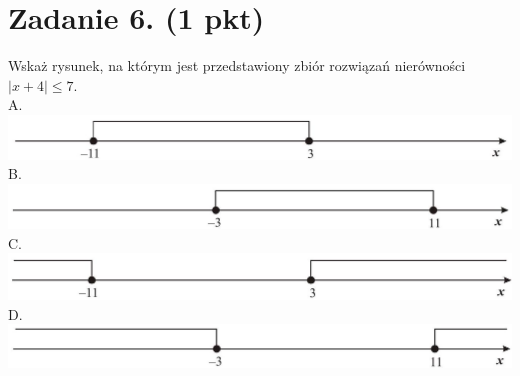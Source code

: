 \documentclass[10pt]{article}
\begin{document}
\section*{Zadanie 6. (1 pkt)}
Wskaż rysunek, na którym jest przedstawiony zbiór rozwiązań nierówności \(|x+4| \leq 7\).\\
A.\\
\includegraphics[max width=\textwidth, center]{2024_11_21_6a8be49478f78d0689cfg-02(1)}\\
B.\\
\includegraphics[max width=\textwidth, center]{2024_11_21_6a8be49478f78d0689cfg-02}\\
C.\\
\includegraphics[max width=\textwidth, center]{2024_11_21_6a8be49478f78d0689cfg-02(2)}\\
D.\\
\includegraphics[max width=\textwidth, center]{2024_11_21_6a8be49478f78d0689cfg-02(3)}
\end{document}
